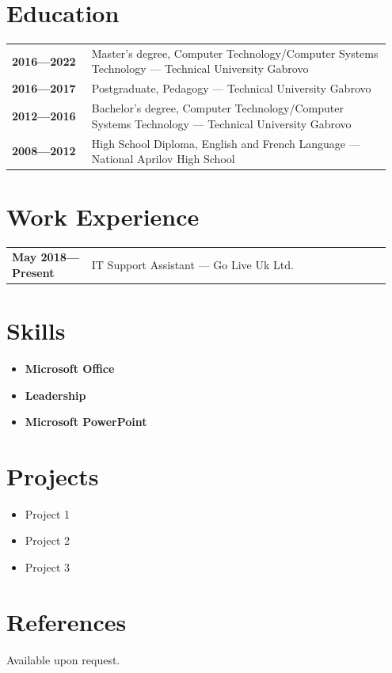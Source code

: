 \documentclass[letterpaper,10pt]{article}
\begin{document}
	\hfill
	\begin{minipage}[t]{0.5\textwidth}
		\section*{Education}
		\begin{tabular}{@{}p{0.2\linewidth} p{0.75\linewidth}}
			\textbf{2016—2022} & Master's degree, Computer Technology/Computer Systems
			Technology — Technical University Gabrovo \\
			\textbf{2016—2017} & Postgraduate, Pedagogy — Technical University Gabrovo \\
			\textbf{2012—2016} & Bachelor's degree, Computer Technology/Computer Systems
			Technology — Technical University Gabrovo \\
			\textbf{2008—2012} & High School Diploma, English and French Language — National Aprilov High School \\
		\end{tabular}
		
		\section*{Work Experience}
		\begin{tabular}{@{}p{0.2\linewidth} p{0.75\linewidth}}
			\textbf{May 2018—Present} & IT Support Assistant — Go Live Uk Ltd. \\
			
		\end{tabular}
		
		\section*{Skills}
		\begin{itemize}
			\item \textbf{Microsoft Office}
			\item \textbf{Leadership}
			\item \textbf{Microsoft PowerPoint}
		\end{itemize}
		
		\section*{Projects}
		\begin{itemize}
			\item Project 1
			\item Project 2
			\item Project 3
		\end{itemize}
		
		\section*{References}
		Available upon request.
	\end{minipage}
	
\end{document}

